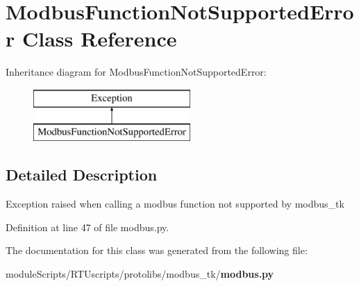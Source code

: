 \section{Modbus\+Function\+Not\+Supported\+Error Class Reference}
\label{classprotolibs_1_1modbus__tk_1_1modbus_1_1_modbus_function_not_supported_error}
Inheritance diagram for Modbus\+Function\+Not\+Supported\+Error\+:\begin{figure}[H]
\begin{center}
\leavevmode
\includegraphics[height=2.000000cm]{classprotolibs_1_1modbus__tk_1_1modbus_1_1_modbus_function_not_supported_error}
\end{center}
\end{figure}


\subsection{Detailed Description}
\begin{DoxyVerb}Exception raised when calling a modbus function not supported by modbus_tk
\end{DoxyVerb}
 

Definition at line 47 of file modbus.\+py.



The documentation for this class was generated from the following file\+:\begin{DoxyCompactItemize}
\item 
module\+Scripts/\+R\+T\+Uscripts/protolibs/modbus\+\_\+tk/{\bf modbus.\+py}\end{DoxyCompactItemize}
